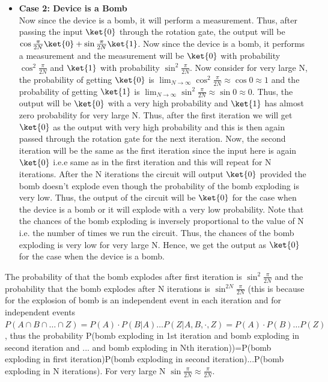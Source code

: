 \documentclass[12pt, oneside]{book}
\theoremstyle{definition}
\theoremstyle{definition}
\theoremstyle{remark}
\begin{document}
\begin{enumerate}
\begin{itemize}
        \item \textbf{Case 2: Device is a Bomb}\\
        Now since the device is a bomb, it will perform a measurement. Thus, after passing the input $\ket{0}$ through the rotation gate, the output will be $\cos\frac{\pi}{2N}\ket{0}+\sin\frac{\pi}{2N}\ket{1}$.
        Now since the device is a bomb, it performs a measurement and the measurement will be $\ket{0}$ with probability $\cos^2\frac{\pi}{2N}$ and $\ket{1}$ with probability $\sin^2\frac{\pi}{2N}$. Now consider for very large N,
        the probability of getting $\ket{0}$ is $\lim_{N\rightarrow \infty} \cos^2\frac{\pi}{2N}\approx \cos 0 \approx 1$ and the probability of getting $\ket{1}$ is $\lim_{N\rightarrow \infty} \sin^2\frac{\pi}{2N}\approx \sin 0 \approx 0$. Thus, the output will be $\ket{0}$ with a very high probability and $\ket{1}$ has almost zero probability for very large N.
        Thus, after the first iteration we will get $\ket{0}$ as the output with very high probability and this is then again passed through the rotation gate for the next iteration. Now, the second iteration will be the same as the first iteration since the input here is again $\ket{0}$ i.e.e same as in the first iteration and this will repeat for N iterations. 
        After the N iterations the circuit will output $\ket{0}$ provided the bomb doesn't explode even though the probability of the bomb exploding is very low. Thus, the output of the circuit will be $\ket{0}$ for the case when the device is a bomb or it will explode with a very low probability. Note that the chances of the bomb exploding is inversely proportional to the 
        value of N i.e. the number of times we run the circuit. Thus, the chances of the bomb exploding is very low for very large N. Hence, we get the output as $\ket{0}$ for the case when the device is a bomb.
    \end{itemize}
    The probability of that the bomb explodes after first iteration is $\sin^2 \frac{\pi}{2N}$ and the probability that the bomb explodes after N iterations is $\sin^{2N} \frac{\pi}{2N}$ (this is because for the explosion of bomb is an independent event in each iteration and for independent events $P(A\cap B \cap \ldots \cap Z)=P(A)\cdot P(B|A)\ldots P(Z|A,B,\cdot,Z)=P(A)\cdot P(B)\ldots P(Z)$, 
    thus the probability P(bomb exploding in 1st iteration and bomb exploding in second iteration and ... and bomb exploding in Nth iteration))=P(bomb exploding in first iteration)P(bomb exploding in second iteration)...P(bomb exploding in N iterations). For very large N $\sin \frac{\pi}{2N} \approx \frac{\pi}{2N}$.

\end{enumerate}
\end{document}
